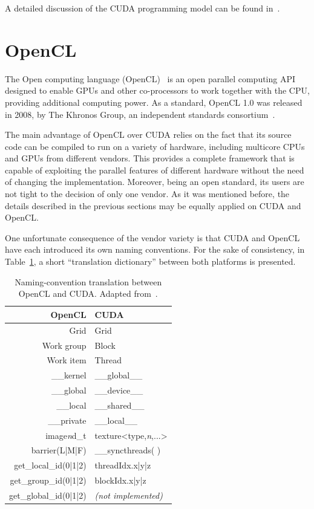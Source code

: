 A detailed discussion of the CUDA programming model can be found in~\cite{Farber-CUDA_application_design_and_development:2011}.


\section{OpenCL \label{sub:02-OpenCL}}

The Open computing language (OpenCL)~\cite{Stone_OpenCL.A.parallel.programming.standard:2010}
is an open parallel computing API designed to enable GPUs and other
co-processors to work together with the CPU, providing additional
computing power. As a standard, OpenCL 1.0 was released in 2008, by
The Khronos Group, an independent standards consortium~\cite{Munshi_The.OpenCL.specification:2009}.

The main advantage of OpenCL over CUDA relies on the fact that its
source code can be compiled to run on a variety of hardware, including
multicore CPUs and GPUs from different vendors. This provides a complete
framework that is capable of exploiting the parallel features of different
hardware without the need of changing the implementation. Moreover,
being an open standard, its users are not tight to the decision of
only one vendor. As it was mentioned before, the details described
in the previous sections may be equally applied on CUDA and OpenCL.

One unfortunate consequence of the vendor variety is that CUDA and
OpenCL have each introduced its own naming conventions. For the sake
of consistency, in Table~\ref{tab:02-CUDA_OpenCL_translation}, a
short ``translation dictionary'' between both platforms is presented.

\begin{table}
\caption{Naming-convention translation between OpenCL and CUDA. Adapted from~\cite{Kloeckner_CUDA.OpenCL.dictionary:2011}.\label{tab:02-CUDA_OpenCL_translation}}


\centering

\begin{tabular}{r|l}
\hline 
\textbf{OpenCL} & \textbf{CUDA}\tabularnewline[\doublerulesep]
\hline 
Grid & Grid\tabularnewline
Work group & Block\tabularnewline
Work item & Thread\tabularnewline
\_\_kernel & \_\_global\_\_\tabularnewline
\_\_global & \_\_device\_\_\tabularnewline
\_\_local & \_\_shared\_\_\tabularnewline
\_\_private & \_\_local\_\_\tabularnewline
image\emph{n}d\_t & texture<type,\emph{n},...>\tabularnewline
barrier(L|M|F) & \_\_syncthreads( )\tabularnewline
get\_local\_id(0|1|2) & threadIdx.x|y|z\tabularnewline
get\_group\_id(0|1|2) & blockIdx.x|y|z\tabularnewline
get\_global\_id(0|1|2) & \emph{(not implemented)}\tabularnewline
\hline 
\end{tabular}
\end{table}


